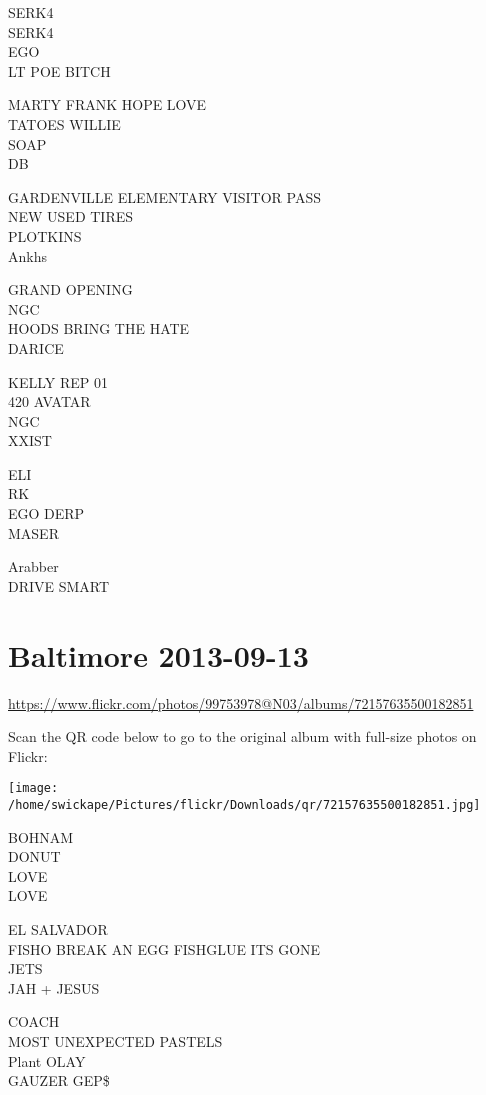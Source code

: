 \documentclass[10pt,letterpaper]{article}
\begin{document}
SERK4\\
SERK4\\
EGO\\
LT POE BITCH

MARTY FRANK HOPE LOVE\\
TATOES WILLIE\\
SOAP\\
DB

GARDENVILLE ELEMENTARY VISITOR PASS\\
NEW USED TIRES\\
PLOTKINS\\
Ankhs

GRAND OPENING\\
NGC\\
HOODS BRING THE HATE\\
DARICE

KELLY REP 01\\
420 AVATAR\\
NGC\\
XXIST

ELI\\
RK\\
EGO DERP\\
MASER

Arabber\\
DRIVE SMART


\section*{Baltimore 2013-09-13}

\url{https://www.flickr.com/photos/99753978@N03/albums/72157635500182851}

Scan the QR code below to go to the original album with full-size photos on Flickr:

\texttt{[image: /home/swickape/Pictures/flickr/Downloads/qr/72157635500182851.jpg]}


BOHNAM\\
DONUT\\
LOVE\\
LOVE

EL SALVADOR\\
FISHO BREAK AN EGG FISHGLUE ITS GONE\\
JETS\\
JAH + JESUS

COACH\\
MOST UNEXPECTED PASTELS\\
Plant OLAY\\
GAUZER GEP\$
\end{document}
